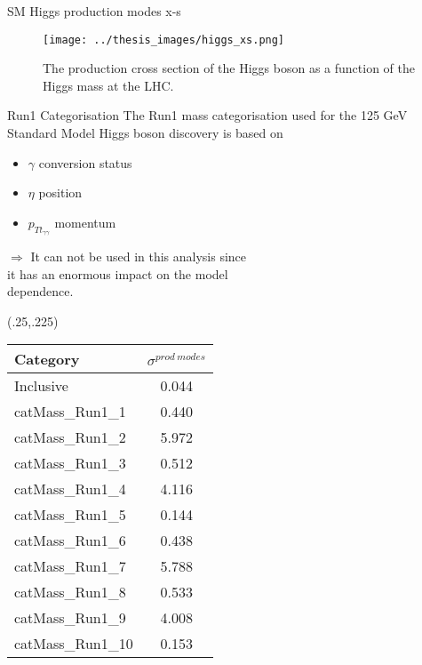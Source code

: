 \documentclass[10pt,UKenglish, leqno, xcolor = dvipsnames]{beamer}
\begin{document}
		\begin{frame}{SM Higgs production modes x-s}
			\vfill
			\begin{figure}
				\centering
				\texttt{[image: ../thesis\_images/higgs\_xs.png]}
				\caption{The production cross section of the Higgs boson as a function of the Higgs mass at the LHC.}
			\end{figure}
			\vfill
		\end{frame}
		
		\begin{frame}{Run1 Categorisation}
			\vspace{.5cm}
			The Run1 mass categorisation used for the 125 GeV Standard Model Higgs boson discovery is based on
			\begin{itemize}
				\item $\gamma$ conversion status
				\item $\eta$ position
				\item $p_{Tt_{\gamma\gamma}}$ momentum 
			\end{itemize}
			\vspace{.2cm}
			$\Rightarrow$ It can not be used in this analysis since\\ it has an enormous impact on the model\\ dependence.		
			\begin{textblock}{1}(.25,.225)
				\begin{table}[htbp]
					\centering
					\begin{tabular}{lc}
						\toprule[1.5pt]
						Category			& $\sigma^{prod\ modes}$	\\
						\midrule
						Inclusive			& 0.044				\\
						\midrule
						catMass\_Run1\_1 	& 0.440				\\
						catMass\_Run1\_2 	& 5.972				\\
						catMass\_Run1\_3 	& 0.512				\\
						catMass\_Run1\_4 	& 4.116				\\
						catMass\_Run1\_5 	& 0.144				\\
						catMass\_Run1\_6 	& 0.438				\\
						catMass\_Run1\_7 	& 5.788				\\
						catMass\_Run1\_8 	& 0.533				\\
						catMass\_Run1\_9 	& 4.008				\\
						catMass\_Run1\_10 	& 0.153				\\
						\bottomrule[1.5pt]
					\end{tabular}
				\end{table}
			\end{textblock}


\end{frame}
\end{document}
